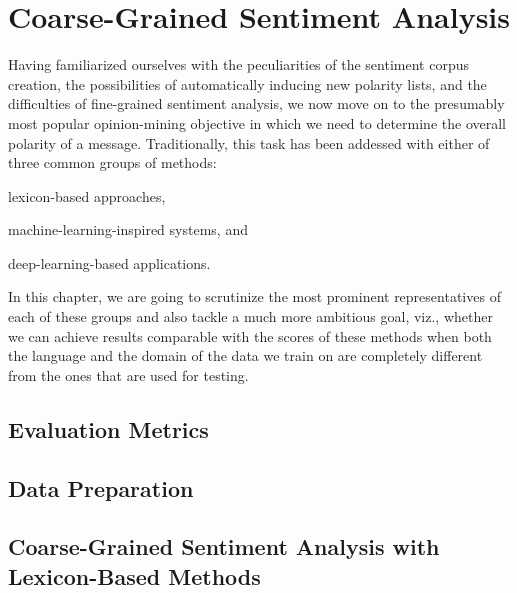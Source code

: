 \chapter{Coarse-Grained Sentiment Analysis}\label{sec:snt:cgsa}

Having familiarized ourselves with the peculiarities of the sentiment
corpus creation, the possibilities of automatically inducing new
polarity lists, and the difficulties of fine-grained sentiment
analysis, we now move on to the presumably most popular opinion-mining
objective in which we need to determine the overall polarity of a
message.  Traditionally, this task has been addessed with either of
three common groups of methods:
\begin{inparaenum}[(i)]
  \item lexicon-based approaches,
  \item machine-learning-inspired systems, and
  \item deep-learning-based applications.
\end{inparaenum}
In this chapter, we are going to scrutinize the most prominent
representatives of each of these groups and also tackle a much more
ambitious goal, viz., whether we can achieve results comparable with
the scores of these methods when both the language and the domain of
the data we train on are completely different from the ones that are
used for testing.

\section{Evaluation Metrics}\label{sec:cgsa:eval-metrics}

\section{Data Preparation}\label{sec:cgsa:data}

\section{Coarse-Grained Sentiment Analysis with Lexicon-Based Methods}

